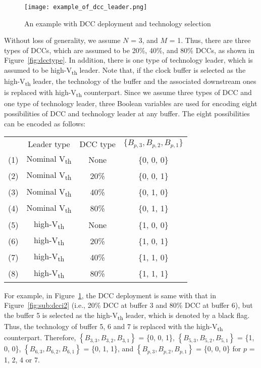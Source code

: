 \begin{figure}
    \centering
    \texttt{[image: example\_of\_dcc\_leader.png]}
    \caption{An example with DCC deployment and technology selection}
    \label{fig:example_dcc_tva}
\end{figure}

Without loss of generality, we assume $N$ = 3, and $M$ = 1. Thus, there are three types of DCCs, which are assumed to be 20\%, 40\%, and 80\% DCCs, as shown in Figure~\ref{fig:dcctype}. In addition, there is one type of technology leader, which is assumed to be high-V\textsubscript{th} leader. Note that, if the clock buffer is selected as the high-V\textsubscript{th} leader, the technology of the buffer and the associated downstream ones is replaced with high-V\textsubscript{th} counterpart. Since we assume three types of DCC and one type of technology leader, three Boolean variables are used for encoding eight possibilities of DCC and technology leader at any buffer. The eight possibilities can be encoded as follows:

{\small
\begin{tabular}{  c  c  c  c  }
  	 & Leader type & DCC type & $\{B_{p,3}, B_{p,2}, B_{p,1}\}$ \\ 
  	(1)\quad & Nominal V\textsubscript{th} & None & \{0, 0, 0\} \\ 
  	(2)\quad & Nominal V\textsubscript{th} &20\% &  \{0, 0, 1\} \\ 
  	(3)\quad & Nominal V\textsubscript{th} &40\% &  \{0, 1, 0\} \\ 
  	(4)\quad & Nominal V\textsubscript{th} &80\% &  \{0, 1, 1\} \\ 
	(5)\quad & high-V\textsubscript{th} & None & \{1, 0, 0\} \\ 
  	(6)\quad & high-V\textsubscript{th} & 20\% &  \{1, 0, 1\} \\ 
  	(7)\quad & high-V\textsubscript{th} & 40\% &  \{1, 1, 0\} \\ 
  	(8)\quad & high-V\textsubscript{th} & 80\% &  \{1, 1, 1\} \\ 
\end{tabular}}


For example, in Figure~\ref{fig:example_dcc_tva}, the DCC deployment is same with that in Figure~\ref{fig:sub:dcci2} (i.e., 20\% DCC at buffer 3 and 80\% DCC at buffer 6), but the buffer 5 is selected as the high-V\textsubscript{th} leader, which is denoted by a black flag. Thus, the technology of buffer 5, 6 and 7 is replaced with the high-V\textsubscript{th} counterpart. Therefore, {\small $\left\{B_{3,3}, B_{3,2}, B_{3,1}\right\}$ = \{0, 0, 1\}}, {\small $\left\{B_{5,3}, B_{5,2}, B_{5,1}\right\}$ = \{1, 0, 0\}}, {\small $\left\{B_{6,3}, B_{6,2}, B_{6,1}\right\}$ = \{0, 1, 1\}}, and {\small $\left\{B_{p,3}, B_{p,2}, B_{p,1}\right\}$ = \{0, 0, 0\}} for $p$ = 1, 2, 4 or 7.

